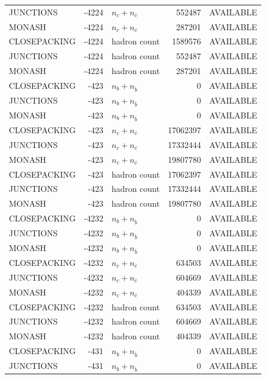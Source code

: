 \begin{landscape}
\begin{longtable}{@{}lrlrl@{}}
JUNCTIONS & -4224 & $n_c+n_{\bar c}$ & \num{552487} & AVAILABLE \\
MONASH & -4224 & $n_c+n_{\bar c}$ & \num{287201} & AVAILABLE \\
CLOSEPACKING & -4224 & hadron count & \num{1589576} & AVAILABLE \\
JUNCTIONS & -4224 & hadron count & \num{552487} & AVAILABLE \\
MONASH & -4224 & hadron count & \num{287201} & AVAILABLE \\
CLOSEPACKING & -423 & $n_b+n_{\bar b}$ & \num{0} & AVAILABLE \\
JUNCTIONS & -423 & $n_b+n_{\bar b}$ & \num{0} & AVAILABLE \\
MONASH & -423 & $n_b+n_{\bar b}$ & \num{0} & AVAILABLE \\
CLOSEPACKING & -423 & $n_c+n_{\bar c}$ & \num{17062397} & AVAILABLE \\
JUNCTIONS & -423 & $n_c+n_{\bar c}$ & \num{17332444} & AVAILABLE \\
MONASH & -423 & $n_c+n_{\bar c}$ & \num{19807780} & AVAILABLE \\
CLOSEPACKING & -423 & hadron count & \num{17062397} & AVAILABLE \\
JUNCTIONS & -423 & hadron count & \num{17332444} & AVAILABLE \\
MONASH & -423 & hadron count & \num{19807780} & AVAILABLE \\
CLOSEPACKING & -4232 & $n_b+n_{\bar b}$ & \num{0} & AVAILABLE \\
JUNCTIONS & -4232 & $n_b+n_{\bar b}$ & \num{0} & AVAILABLE \\
MONASH & -4232 & $n_b+n_{\bar b}$ & \num{0} & AVAILABLE \\
CLOSEPACKING & -4232 & $n_c+n_{\bar c}$ & \num{634503} & AVAILABLE \\
JUNCTIONS & -4232 & $n_c+n_{\bar c}$ & \num{604669} & AVAILABLE \\
MONASH & -4232 & $n_c+n_{\bar c}$ & \num{404339} & AVAILABLE \\
CLOSEPACKING & -4232 & hadron count & \num{634503} & AVAILABLE \\
JUNCTIONS & -4232 & hadron count & \num{604669} & AVAILABLE \\
MONASH & -4232 & hadron count & \num{404339} & AVAILABLE \\
CLOSEPACKING & -431 & $n_b+n_{\bar b}$ & \num{0} & AVAILABLE \\
JUNCTIONS & -431 & $n_b+n_{\bar b}$ & \num{0} & AVAILABLE \\

\end{longtable}
\end{landscape}
